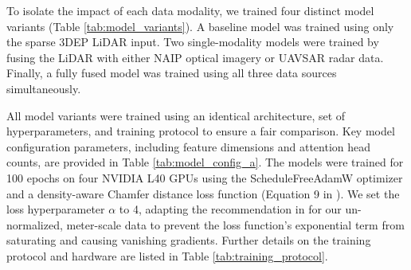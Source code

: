 \documentclass[remotesensing,article,accept,pdftex,moreauthors]{Definitions/mdpi}
\begin{document}
To isolate the impact of each data modality, we trained four distinct model variants (Table \ref{tab:model_variants}). A baseline model was trained using only the sparse 3DEP LiDAR input. Two single-modality models were trained by fusing the LiDAR with either NAIP optical imagery or UAVSAR radar data. Finally, a fully fused model was trained using all three data sources simultaneously.
\begin{table}[htbp]
  \centering
\end{table}


\vspace{-3pt}
All model variants were trained using an identical architecture, set of hyperparameters, and training protocol to ensure a fair comparison. Key model configuration parameters, including feature dimensions and attention head counts, are provided in Table \ref{tab:model_config_a}. The models were trained for 100 epochs on four NVIDIA L40 GPUs using the ScheduleFreeAdamW optimizer \cite{defazio_road_2024} and a density-aware Chamfer distance loss function (Equation 9 in \cite{wu_density-aware_2021}). We set the loss hyperparameter $\alpha$ to 4, adapting the recommendation in \cite{wu_density-aware_2021} for our un-normalized, meter-scale data to prevent the loss function's exponential term from saturating and causing vanishing gradients. Further details on the training protocol and hardware are listed in Table \ref{tab:training_protocol}.
\end{document}

